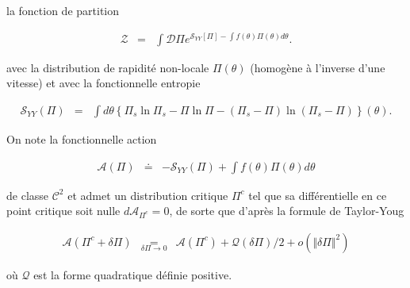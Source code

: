 la fonction de partition 

\begin{eqnarray*}
	\mathcal{Z} & = & \int \mathcal{D}\Pi e^{\mathcal{S}_{YY}[\Pi]-\int f(\theta)\Pi(\theta)d\theta }.
\end{eqnarray*}

avec la distribution de rapidité non-locale  $\Pi(\theta)$ (homogène à l'inverse d'une vitesse) et avec la fonctionnelle entropie 

\begin{eqnarray*}
	\mathcal{S}_{YY}(\Pi) & = & \int d\theta \left \{ \Pi_s \ln \Pi_s - \Pi \ln \Pi - ( \Pi_s - \Pi ) \ln (\Pi_s - \Pi) \right\}(\theta). 	
\end{eqnarray*}

On note la fonctionnelle action 

\begin{eqnarray*}
	\mathcal{A}(\Pi) & \doteq & -\mathcal{S}_{YY}(\Pi) + \int f(\theta)\Pi(\theta)d\theta	
\end{eqnarray*}

de classe $\mathcal{C}^2$ et admet un distribution critique $\Pi^c$ tel que sa différentielle en ce point critique soit nulle $d\mathcal{A}_{\Pi^c} =0$, de sorte que d'après la formule de Taylor-Youg 

\begin{eqnarray*}
	\mathcal{A}(\Pi^c +  \delta\Pi) & \underset{ \delta \Pi \to 0 }{=} & 	\mathcal{A}(\Pi^c ) + \mathcal{Q}(\delta\Pi)/2 + o(\Vert \delta \Pi \Vert^2) 	
\end{eqnarray*}

où $\mathcal{Q}$ est la forme quadratique définie positive.

\begin{figure}[H]
	\centering 
	\captionsetup{skip=10pt} %
\end{figure}
 







